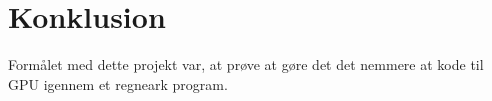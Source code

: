 \section{Konklusion}
Formålet med dette projekt var, at prøve at gøre det det nemmere at kode til GPU igennem et regneark program.